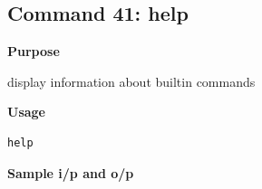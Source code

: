 \subsection{Command 41: help} 
\textbf{Purpose}
\begin{flushleft}
display information about builtin commands
\end{flushleft}
\textbf{Usage}
\begin{verbatim}
help
\end{verbatim}
\textbf{Sample i/p and o/p}
\begin{figure}[H] 
\end{figure}
